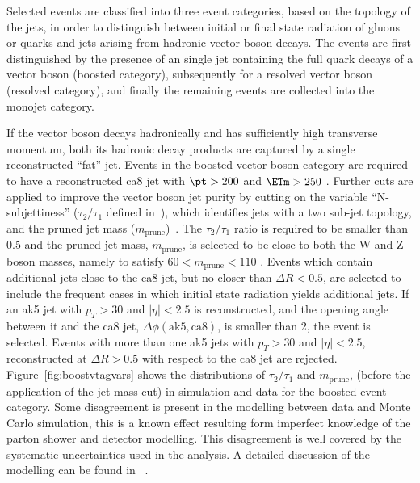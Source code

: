 Selected events are classified into three event categories, based on the topology of the jets, in order to distinguish between 
initial or final state radiation of gluons or quarks and jets arising from hadronic vector boson decays.
The events are first distinguished by the presence of an single jet
containing the full quark decays of a vector boson (boosted category), subsequently for a resolved vector
boson (resolved category), and finally the remaining events are collected into the monojet category. 

If the vector boson decays hadronically and has sufficiently high transverse momentum, both its hadronic
decay products are captured by a single reconstructed ``fat''-jet.
Events in the boosted vector boson category are required to
have a reconstructed ca8 jet with $\pt>200$ \gev and  $\ETm>250$ \gev.  Further cuts are applied to improve the vector boson jet
purity by cutting on the variable ``N-subjettiness'' ($\tau_2/\tau_1$ defined in~\cite{Thaler:2010tr,Thaler:2011gf}), which identifies jets with a 
two sub-jet topology, and the pruned jet mass ($m_{\mathrm{prune}}$)~\cite{Ellis:2009me}. The $\tau_2/\tau_1$ ratio
is required to be smaller than 0.5 and the pruned jet mass, $m_{\mathrm{prune}}$, is selected to
be close to both the W and Z boson masses, namely to satisfy $60<m_{\mathrm{prune}}<110$ \gev.   
Events which contain additional jets close to the ca8 jet, but no closer than $\Delta R < 0.5$,
are selected to include the frequent cases in which initial state radiation yields additional jets. 
If an ak5 jet with $p_T>30$ and $|\eta|<2.5$ is reconstructed, and the opening angle between it 
and the ca8 jet, $\Delta\phi(\mathrm{ak5,ca8})$, is smaller than 2, the event is selected. Events with more than one ak5 jets 
with $p_T>30$ \gev and $|\eta|<2.5$, reconstructed at $\Delta R> 0.5$ with respect to the ca8 jet 
are rejected.
Figure~\ref{fig:boostvtagvars} shows the distributions of $\tau_2/\tau_1$ and $m_{\mathrm{prune}}$, (before the application 
of the jet mass cut) in simulation and data for the boosted event
category. Some disagreement is present in the modelling between data
and Monte Carlo simulation, this is a known effect resulting form
imperfect knowledge of the parton shower and detector modelling. This disagreement is well covered by the systematic uncertainties used in the analysis. A detailed discussion of the modelling can be found in ~\cite{Khachatryan:2014vla}.  
